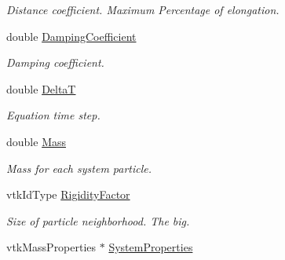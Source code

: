\begin{DoxyCompactItemize}
\begin{DoxyCompactList}\small\item\em Distance coefficient. Maximum Percentage of elongation. \item\end{DoxyCompactList}\item 
\hypertarget{classvtkParticleSpringSystem_a6deb571253d0bbedeea8fcb3db156ffb}{
double \hyperlink{classvtkParticleSpringSystem_a6deb571253d0bbedeea8fcb3db156ffb}{DampingCoefficient}}
\label{classvtkParticleSpringSystem_a6deb571253d0bbedeea8fcb3db156ffb}

\begin{DoxyCompactList}\small\item\em Damping coefficient. \item\end{DoxyCompactList}\item 
\hypertarget{classvtkParticleSpringSystem_a979c7c7b6d373d36d7de784e849f7611}{
double \hyperlink{classvtkParticleSpringSystem_a979c7c7b6d373d36d7de784e849f7611}{DeltaT}}
\label{classvtkParticleSpringSystem_a979c7c7b6d373d36d7de784e849f7611}

\begin{DoxyCompactList}\small\item\em Equation time step. \item\end{DoxyCompactList}\item 
\hypertarget{classvtkParticleSpringSystem_a9eee2250af8330144e97495d47c407e2}{
double \hyperlink{classvtkParticleSpringSystem_a9eee2250af8330144e97495d47c407e2}{Mass}}
\label{classvtkParticleSpringSystem_a9eee2250af8330144e97495d47c407e2}

\begin{DoxyCompactList}\small\item\em Mass for each system particle. \item\end{DoxyCompactList}\item 
\hypertarget{classvtkParticleSpringSystem_a44940cb9db67b8f259656db65c66875d}{
vtkIdType \hyperlink{classvtkParticleSpringSystem_a44940cb9db67b8f259656db65c66875d}{RigidityFactor}}
\label{classvtkParticleSpringSystem_a44940cb9db67b8f259656db65c66875d}

\begin{DoxyCompactList}\small\item\em Size of particle neighborhood. The big. \item\end{DoxyCompactList}\item 
\hypertarget{classvtkParticleSpringSystem_a622b085f4befecd25ce0b535302306e1}{
vtkMassProperties $\ast$ \hyperlink{classvtkParticleSpringSystem_a622b085f4befecd25ce0b535302306e1}{SystemProperties}}
\label{classvtkParticleSpringSystem_a622b085f4befecd25ce0b535302306e1}


\end{DoxyCompactItemize}
